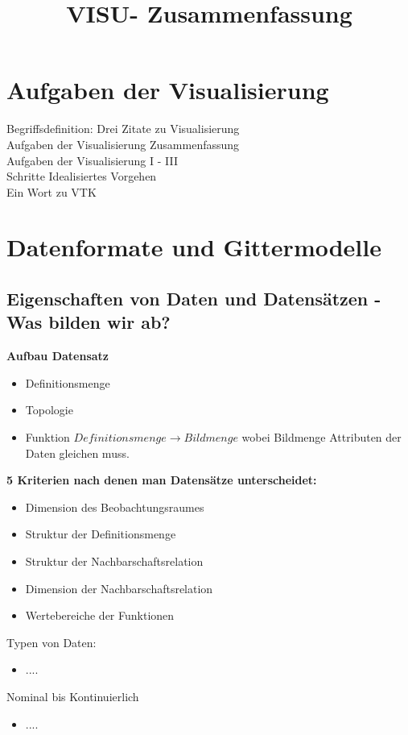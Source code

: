 \documentclass{article}
\title{\vspace{-5mm}%
	\fontsize{24pt}{10pt}\selectfont
	\textbf{VISU- Zusammenfassung}
}
\begin{document}
\maketitle	
\pagebreak

\tableofcontents
\pagebreak


\section{Aufgaben der Visualisierung}
Begriffsdefinition: Drei Zitate zu Visualisierung\\
Aufgaben der Visualisierung Zusammenfassung\\
Aufgaben der Visualisierung I - III\\
Schritte Idealisiertes Vorgehen\\
Ein Wort zu VTK
\pagebreak

\section{Datenformate und Gittermodelle}
\subsection{Eigenschaften von Daten und Datensätzen - Was bilden wir ab?} 
\textbf{Aufbau Datensatz}\\

\begin{itemize}[noitemsep]
	\item Definitionsmenge
	\item Topologie
	\item Funktion $Definitionsmenge \rightarrow Bildmenge$ wobei Bildmenge Attributen der Daten gleichen muss.
\end{itemize}


\noindent \textbf{5 Kriterien nach denen man Datensätze unterscheidet:}
\begin{itemize}[noitemsep]
	\item Dimension des Beobachtungsraumes
	\item Struktur der Definitionsmenge
	\item Struktur der Nachbarschaftsrelation
	\item Dimension der Nachbarschaftsrelation
	\item Wertebereiche der Funktionen
\end{itemize}

\noindent Typen von Daten:
\begin{itemize}[noitemsep]
	\item ....
\end{itemize}
Nominal bis Kontinuierlich
\begin{itemize}[noitemsep]
	\item ....
\end{itemize}
\end{document}
